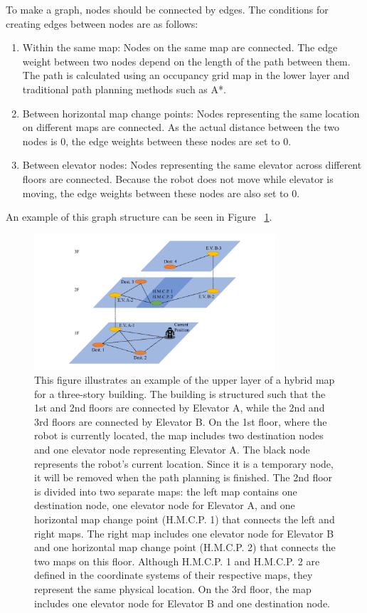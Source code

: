 \documentclass[en]{snu-cse-bsc-thesis}
\begin{document}
To make a graph, nodes should be connected by edges. The conditions for creating edges between nodes are as follows:
\begin{enumerate}
  \item Within the same map: Nodes on the same map are connected. 
  The edge weight between two nodes depend on the length of the path between them. 
  The path is calculated using an occupancy grid map in the lower layer and traditional path planning methods such as A*.
  \item Between horizontal map change points: Nodes representing the same location on different maps are connected. As the actual distance between the two nodes is 0, the edge weights between these nodes are set to 0.
  \item Between elevator nodes: Nodes representing the same elevator across different floors are connected. 
  Because the robot does not move while elevator is moving, the edge weights between these nodes are also set to 0.
\end{enumerate}
An example of this graph structure can be seen in Figure ~\ref{fig:graph_outline}.
\begin{figure}[!t]
  \centering
  \includegraphics[width=0.8\textwidth]{gcg graph outline.pdf}
  \caption{This figure illustrates an example of the upper layer of a hybrid map for a three-story building. The building is structured such that the 1st and 2nd floors are connected by Elevator A, while the 2nd and 3rd floors are connected by Elevator B. On the 1st floor, where the robot is currently located, the map includes two destination nodes and one elevator node representing Elevator A. The black node represents the robot's current location. Since it is a temporary node, it will be removed when the path planning is finished. The 2nd floor is divided into two separate maps: the left map contains one destination node, one elevator node for Elevator A, and one horizontal map change point (H.M.C.P. 1) that connects the left and right maps. The right map includes one elevator node for Elevator B and one horizontal map change point (H.M.C.P. 2) that connects the two maps on this floor. Although H.M.C.P. 1 and H.M.C.P. 2 are defined in the coordinate systems of their respective maps, they represent the same physical location. On the 3rd floor, the map includes one elevator node for Elevator B and one destination node.}
  \label{fig:graph_outline}
\end{figure}
\end{document}
